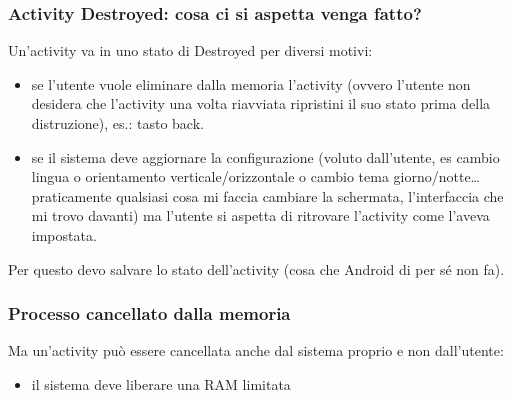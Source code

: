 \subsubsection{Activity Destroyed: cosa ci si aspetta venga fatto?}
\par Un'activity va in uno stato di Destroyed per diversi motivi:
\begin{itemize}
    \item se l'utente vuole eliminare dalla memoria l'activity (ovvero l'utente non desidera che l'activity una volta riavviata ripristini il suo stato prima della distruzione), es.: tasto back.
    \item se il sistema deve aggiornare la configurazione (voluto dall'utente, es cambio lingua o orientamento verticale/orizzontale o cambio tema giorno/notte\dots praticamente qualsiasi cosa mi faccia cambiare la schermata, l'interfaccia che mi trovo davanti) ma l'utente si aspetta di ritrovare l'activity come l'aveva impostata. 
\end{itemize}
\par Per questo devo salvare lo stato dell'activity (cosa che Android di per sé non fa).

\subsubsection{Processo cancellato dalla memoria}
\par Ma un'activity può essere cancellata anche dal sistema proprio e non dall'utente:
\begin{itemize}
    \item il sistema deve liberare una RAM limitata
\end{itemize}

